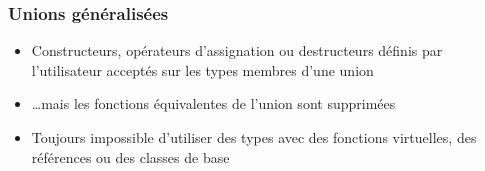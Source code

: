 \documentclass[C++.tex]{subfiles}
\begin{document}
\begin{frame}[fragile]
	\frametitle{Unions généralisées}
	\begin{itemize}
		\item Constructeurs, opérateurs d'assignation ou destructeurs définis par l'utilisateur acceptés sur les types membres d'une union
		\item \ldots mais les fonctions équivalentes de l'union sont supprimées


		\item Toujours impossible d'utiliser des types avec des fonctions virtuelles, des références ou des classes de base
	\end{itemize}
\end{frame}
\end{document}
